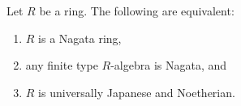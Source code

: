 %

\begin{proposition}[Nagata]
\label{proposition-nagata-universally-japanese}
Let $R$ be a ring. The following are equivalent:
\begin{enumerate}
\item $R$ is a Nagata ring,
\item any finite type $R$-algebra is Nagata, and
\item $R$ is universally Japanese and Noetherian.
\end{enumerate}
\end{proposition}

